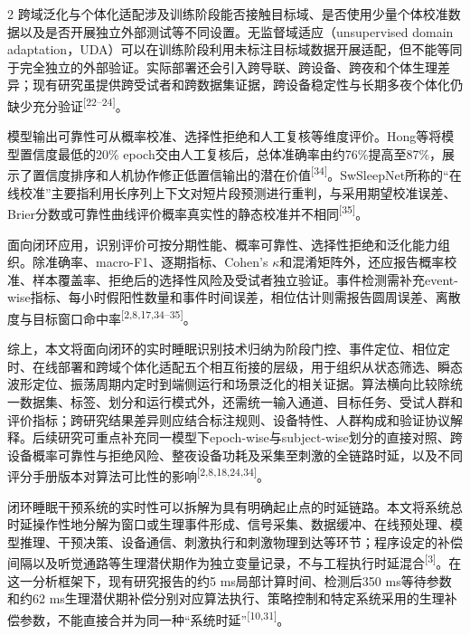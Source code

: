 \documentclass[UTF8,zihao=5,fontset=none]{ctexart}
\newcommand{\hei}{\CJKfamily{hei}}
\newcommand{\leveltwo}[1]{%
  \par\noindent{\hei\fontsize{10.5pt}{12.6pt}\selectfont\mdseries #1\par}}
\newcommand{\refcite}[1]{\nolinebreak[4]\textsuperscript{[#1]}}
\begin{document}
\begin{multicols}{2}
跨域泛化与个体化适配涉及训练阶段能否接触目标域、是否使用少量个体校准数据以及是否开展独立外部测试等不同设置。无监督域适应（unsupervised domain adaptation，UDA）可以在训练阶段利用未标注目标域数据开展适配，但不能等同于完全独立的外部验证。实际部署还会引入跨导联、跨设备、跨夜和个体生理差异；现有研究虽提供跨受试者和跨数据集证据，跨设备稳定性与长期多夜个体化仍缺少充分验证\refcite{22--24}。\par

模型输出可靠性可从概率校准、选择性拒绝和人工复核等维度评价。Hong等将模型置信度最低的20\% epoch交由人工复核后，总体准确率由约76\%提高至87\%，展示了置信度排序和人机协作修正低置信输出的潜在价值\refcite{34}。SwSleepNet所称的“在线校准”主要指利用长序列上下文对短片段预测进行重判，与采用期望校准误差、Brier分数或可靠性曲线评价概率真实性的静态校准并不相同\refcite{35}。\par

面向闭环应用，识别评价可按分期性能、概率可靠性、选择性拒绝和泛化能力组织。除准确率、macro-F1、逐期指标、Cohen's $\kappa$和混淆矩阵外，还应报告概率校准、样本覆盖率、拒绝后的选择性风险及受试者独立验证。事件检测需补充event-wise指标、每小时假阳性数量和事件时间误差，相位估计则需报告圆周误差、离散度与目标窗口命中率\refcite{2,8,17,34--35}。\par

综上，本文将面向闭环的实时睡眠识别技术归纳为阶段门控、事件定位、相位定时、在线部署和跨域个体化适配五个相互衔接的层级，用于组织从状态筛选、瞬态波形定位、振荡周期内定时到端侧运行和场景泛化的相关证据。算法横向比较除统一数据集、标签、划分和运行模式外，还需统一输入通道、目标任务、受试人群和评价指标；跨研究结果差异则应结合标注规则、设备特性、人群构成和验证协议解释。后续研究可重点补充同一模型下epoch-wise与subject-wise划分的直接对照、跨设备概率可靠性与拒绝风险、整夜设备功耗及采集至刺激的全链路时延，以及不同评分手册版本对算法可比性的影响\refcite{2,8,18,24,34}。\par

\leveltwo{2.3 闭环时延链路、同步机制与机会级评价}

闭环睡眠干预系统的实时性可以拆解为具有明确起止点的时延链路。本文将系统总时延操作性地分解为窗口或生理事件形成、信号采集、数据缓冲、在线预处理、模型推理、干预决策、设备通信、刺激执行和刺激物理到达等环节；程序设定的补偿间隔以及听觉通路等生理潜伏期作为独立变量记录，不与工程执行时延混合\refcite{3}。在这一分析框架下，现有研究报告的约5 ms局部计算时间、检测后350 ms等待参数和约62 ms生理潜伏期补偿分别对应算法执行、策略控制和特定系统采用的生理补偿参数，不能直接合并为同一种“系统时延”\refcite{10,31}。\par


\end{multicols}
\end{document}

